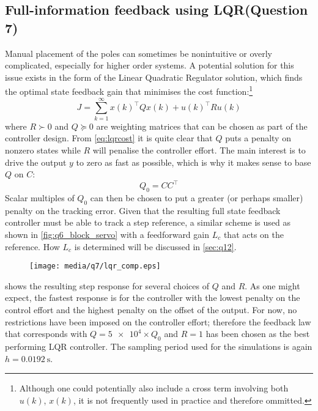 \subsection{Full-information feedback using LQR\textnormal{\phantom{xxx}(Question 7)}}
\label{sec:ss_lqr}
Manual placement of the poles can sometimes be nonintuitive or overly complicated, especially for higher order systems. A potential solution for this issue exists in the form of the Linear Quadratic Regulator solution, which finds the optimal state feedback gain that minimises the cost function:\footnote{Although one could potentially also include a cross term involving both $u(k)$, $x(k)$, it is not frequently used in practice and therefore ommitted.}
\begin{equation}
    J = \sum^\infty_{k=1} x(k)^\top Q x(k) + u(k)^\top R u(k)
    \label{eq:lqrcost}
\end{equation}
where $R\succ 0$ and $Q \succeq 0$ are weighting matrices that can be chosen as part of the controller design. From \cref{eq:lqrcost} it is quite clear that $Q$ puts a penalty on nonzero states while $R$ will penalise the controller effort. The main interest is to drive the output $y$ to zero as fast as possible, which is why it makes sense to base $Q$ on $C$:
                $$ Q_0 = CC^\top $$
Scalar multiples of $Q_0$ can then be chosen to put a greater (or perhaps smaller) penalty on the tracking error. Given that the resulting full state feedback controller must be able to track a step reference, a similar scheme is used as shown in \cref{fig:q6_block_servo} with a feedforward gain $L_c$ that acts on the reference. How $L_c$ is determined will be discussed in \cref{sec:q12}. 
\begin{figure}
    \centering
    \texttt{[image: media/q7/lqr\_comp.eps]}
    \caption{}
    \label{fig:q7_lqr_comp}
\end{figure}
 shows the resulting step response for several choices of $Q$ and $R$. As one might expect, the fastest response is for the controller with the lowest penalty on the control effort and the highest penalty on the offset of the output. For now, no restrictions have been imposed on the controller effort; therefore the feedback law that corresponds with $Q = \num{5e4}\times Q_0$ and $R = 1$ has been chosen as the best performing LQR controller. The sampling period used for the simulations is again $h = \SI{0.0192}{\second}$.